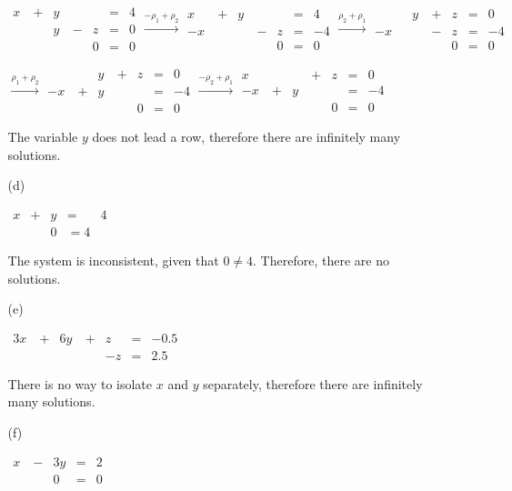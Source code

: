 \documentclass{article}
\begin{document}
\begin{enumerate}
\begin{enumerate}
$\begin{aligned}
x&\ +&y&&&=&4\\
&&y&\ -&z&=&0\\
&&&&0&=&0
\end{aligned}
\overset{-\rho_1+\rho_2}{\longrightarrow}
\begin{aligned}
x&\ +&y&&&=&4\\
-x&&&\ -&z&=&-4\\
&&&&0&=&0
\end{aligned}
\overset{\rho_2+\rho_1}{\longrightarrow}
\begin{aligned}
&&y&\ +&z&=&0\\
-x&&&\ -&z&=&-4\\
&&&&0&=&0
\end{aligned}$

$\overset{\rho_1+\rho_2}{\longrightarrow}
\begin{aligned}
&&y&\ +&z&=&0\\
-x&\ +&y&&&=&-4\\
&&&&0&=&0
\end{aligned}
\overset{-\rho_2+\rho_1}{\longrightarrow}
\begin{aligned}
x&&&\ +&z&=&0\\
-x&\ +&y&&&=&-4\\
&&&&0&=&0
\end{aligned}$

The variable $y$ does not lead a row, therefore there are infinitely many solutions.

\item[(d)]

$\begin{aligned}
x&+&y&=&4\\
&&0&=4
\end{aligned}$

The system is inconsistent, given that $0\neq4$. Therefore, there are no solutions.

\item[(e)]

$\begin{aligned}
3x&\ +&6y&\ +&z&=&-0.5\\
&&&&-z&=&2.5
\end{aligned}$

There is no way to isolate $x$ and $y$ separately, therefore there are infinitely many solutions.

\item[(f)]

$\begin{aligned}
x&\ -&3y&=&2\\
&&0&=&0
\end{aligned}$


\end{enumerate}
\end{enumerate}
\end{document}
